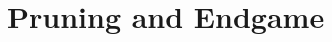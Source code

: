 \documentclass{amsart}%
\numberwithin{equation}{section}
\theoremstyle{remark}
\newcommand{\1}{\mathbbm{1}}
\begin{document}



\bigskip

\section{Pruning and Endgame}\label{sec3}
\end{document}
